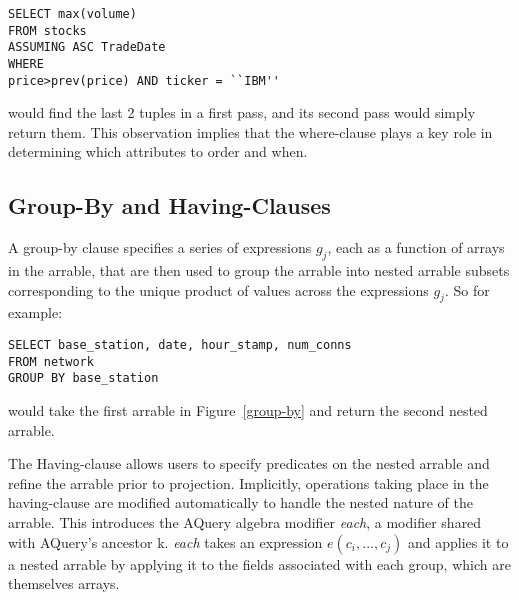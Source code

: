 \documentclass{acm_proc_article-sp}
\begin{document}
\begin{lstlisting}
SELECT max(volume) 
FROM stocks 
ASSUMING ASC TradeDate 
WHERE
price>prev(price) AND ticker = ``IBM''  
\end{lstlisting}

would find the last 2 tuples in a first pass, and its second pass would simply return them.
This observation implies that the where-clause plays a key role
in determining which attributes to order and when. 


\subsection{Group-By and Having-Clauses}
A group-by clause specifies a series of expressions $g_j$, each as a function of arrays in the arrable, that are then used to group the arrable into nested arrable subsets corresponding to the unique
product of values across the expressions $g_j$.  So for example:

\begin{lstlisting}
SELECT base_station, date, hour_stamp, num_conns
FROM network 
GROUP BY base_station
\end{lstlisting}

would take the first arrable in Figure~\ref{group-by} and return the second nested arrable.

The Having-clause allows users to specify predicates on the nested arrable and refine the arrable prior to projection. Implicitly, operations taking place in the having-clause are modified automatically to handle the nested nature of the arrable. This introduces the AQuery algebra modifier \textit{each}, a modifier shared with AQuery's ancestor k\cite{kxsystems}. \textit{each} takes an expression $e(c_i, ..., c_j)$ and applies it to a nested arrable by applying it to the fields associated with each group, which are themselves arrays.
\end{document}
